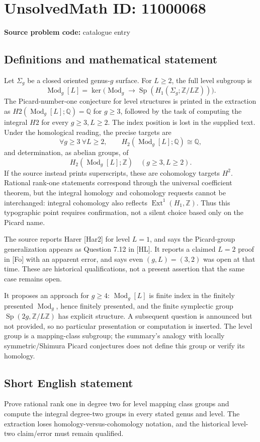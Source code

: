 \documentclass[11pt]{article}
\newcommand{\Z}{\mathbb{Z}}
\newcommand{\Q}{\mathbb{Q}}
\begin{document}
\section*{UnsolvedMath ID: 11000068}
\textbf{Source problem code:} catalogue entry
\subsection{Definitions and mathematical statement}
Let \(\Sigma_g\) be a closed oriented genus-\(g\) surface. For \(L\geq2\), the full level subgroup is
\[\operatorname{Mod}_g[L]=\ker\bigl(\operatorname{Mod}_g\to\operatorname{Sp}(H_1(\Sigma_g;\Z/L\Z))\bigr).\]
The Picard-number-one conjecture for level structures is printed in the extraction as \(H2(\operatorname{Mod}_g[L];\Q)=\Q\) for \(g\geq3\), followed by the task of computing the integral \(H2\) for every \(g\geq3,L\geq2\). The index position is lost in the supplied text. Under the homological reading, the precise targets are
\[\forall g\geq3\ \forall L\geq2,\qquad H_2(\operatorname{Mod}_g[L];\Q)\cong\Q,\]
and determination, as abelian groups, of
\[H_2(\operatorname{Mod}_g[L];\Z)\quad(g\geq3,L\geq2).\]
If the source instead prints superscripts, these are cohomology targets \(H^2\). Rational rank-one statements correspond through the universal coefficient theorem, but the integral homology and cohomology requests cannot be interchanged: integral cohomology also reflects \(\operatorname{Ext}^1(H_1,\Z)\). Thus this typographic point requires confirmation, not a silent choice based only on the Picard name.

The source reports Harer [Har2] for level \(L=1\), and says the Picard-group generalization appears as Question 7.12 in [HL]. It reports a claimed \(L=2\) proof in [Fo] with an apparent error, and says even \((g,L)=(3,2)\) was open at that time. These are historical qualifications, not a present assertion that the same case remains open.

It proposes an approach for \(g\geq4\): \(\operatorname{Mod}_g[L]\) is finite index in the finitely presented \(\operatorname{Mod}_g\), hence finitely presented, and the finite symplectic group \(\operatorname{Sp}(2g,\Z/L\Z)\) has explicit structure. A subsequent question is announced but not provided, so no particular presentation or computation is inserted. The level group is a mapping-class subgroup; the summary's analogy with locally symmetric/Shimura Picard conjectures does not define this group or verify its homology.
\subsection{Short English statement}
Prove rational rank one in degree two for level mapping class groups and compute the integral degree-two groups in every stated genus and level. The extraction loses homology-versus-cohomology notation, and the historical level-two claim/error must remain qualified.
\end{document}
